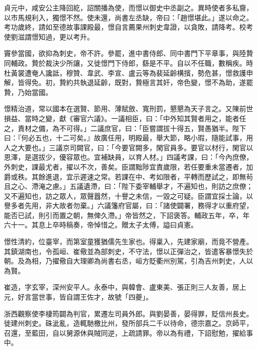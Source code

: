 \begin{pinyinscope}
 貞元中，咸安公主降回紇，詔關播為使，而憬以御史中丞副之。異時使者多私齎，以市馬規利入，獨憬不然。使未還，尚書左丞缺，帝曰：「趙憬堪此。」遂以命之。考功歲終，請如至德故事課殿最，憬自言薦果州刺史韋證，以貪敗，請降考。校考使劉滋謂憬知過，更以考升。



 竇參當國，欲抑為刺史，帝不許。參罷，進中書侍郎、同中書門下平章事，與陸贄同輔政。贄於裁決少所讓，又徙憬門下侍郎，繇是不平。自以不任職，數稱疾。時杜黃裳遭奄人讒詆，穆贊、韋武、李宣、盧云等為裴延齡構擯，勢危甚，憬救護申解，皆得免。初，贄約共執退延齡，既對，贄極言其奸，帝色變，憬不為助，遂罷贄，乃始當國。



 憬精治道，常以國本在選賢、節用、薄賦斂、寬刑罰，懇懇為天子言之。又陳前世損益、當時之變，獻《審官六議》。一議相臣，曰：「中外知其賢者用之，能者任之，責材之備，為不可得。」二議庶官，曰：「臣嘗謂拔十得五，賢愚猶半。陛下曰：『何必五也，十二可矣。』故廣任用，明殿最，舉大節，略小瑕，隨能試事，用人之大要也。」三議京司闕官，曰：「今要官闕多，閑官員多。要官以材行，閑官以恩澤，是選拔少，優容眾也。宜補缺員，以育人材。」四議考課，曰：「今內庶僚，外刺史，課最尤者，擢以不次，善矣。臣謂黜陟宜責歲限，若任要重未當遷者，加爵或秩。其餘進退，宜示遲速之常。若課在中、考如限者，平轉而歷試之，即無茍且之心、滯淹之慮。」五議遺滯，曰：「陛下委宰輔舉才，不遍知也，則訪之庶僚；又不遍知也，訪之眾人，眾聲囂然，十譽之未信，一毀之可疑。臣謂宜採士論，以譽多者先用，非大故者勿棄。」六議籓府官屬，曰：「諸使闢署，務得才以重府望，能否已試，則引而置之朝，無俾久滯。」帝皆然之，下詔褒答。輔政五年，卒，年六十一。其息上卒時稿奏，帝悼惜之。贈太子太傅，謚曰貞憲。



 憬性清約，位臺宰，而第室童獲猶儒先生家也。得稟入，先建家廟，而竟不營產。其鎮湖南也，令孤峘、崔儆並為部刺史，不守法，憬以正彈治之，皆遣客暴憬失於朝。及為相，乃擢儆自大理卿為尚書右丞，峘方貶衢州別駕，引為吉州刺史，人以為賢。



 崔造，字玄宰，深州安平人。永泰中，與韓會、盧東美、張正則三人友善，居上元，好言當世事，皆自謂王佐才，故號「四夔」。



 浙西觀察使李棲筠闢為判官，累遷左司員外郎。與劉晏善，晏得罪，貶信州長史。徙建州刺史。硃泚亂，造輒馳檄比州，發所部兵二千以待命，德宗嘉之。京師平，召還，至藍田，自以舅源休與賊同逆，上疏請罪。帝以為有禮，下詔慰勉，擢給事中。




\end{pinyinscope}
